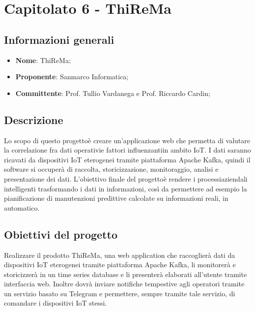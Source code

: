 \section{Capitolato 6 - ThiReMa}
\subsection{Informazioni generali}
\begin{itemize}
	\item \textbf{Nome}: ThiReMa;
	\item \textbf{Proponente}: Sanmarco Informatica;
	\item \textbf{Committente}: Prof. Tullio Vardanega e Prof. Riccardo Cardin;
\end{itemize}
\subsection{Descrizione}
Lo scopo di questo progetto\glosp è creare un'applicazione web che permetta di valutare la correlazione fra dati operativi\glosp e fattori influenzanti\glosp in ambito IoT. I dati saranno ricavati da dispositivi IoT eterogenei tramite piattaforma Apache Kafka, quindi il software si occuperà di raccolta, storicizzazione, monitoraggio, analisi e presentazione dei dati.
L'obiettivo finale del progetto\glosp è rendere i processi\glosp aziendali intelligenti trasformando i dati in informazioni, così da permettere ad esempio la pianificazione di manutenzioni predittive calcolate su informazioni reali, in automatico.

\subsection{Obiettivi del progetto}
Realizzare il prodotto ThiReMa, una web application che raccoglierà dati da dispositivi IoT eterogenei tramite piattaforma Apache Kafka, li monitorerà e storicizzerà in un time series database e li presenterà elaborati all'utente tramite interfaccia web. Inoltre dovrà inviare notifiche tempestive agli operatori tramite un servizio basato su Telegram e permettere, sempre tramite tale servizio, di comandare i dispositivi IoT stessi.

